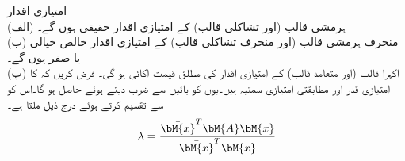 \quad امتیازی اقدار\\
(الف) ہرمشی قالب (اور تشاکلی قالب) کے امتیازی اقدار حقیقی ہوں گے۔\\
(ب) منحرف ہرمشی قالب (اور منحرف تشاکلی قالب) کے امتیازی اقدار خالص خیالی یا صفر  ہوں گے۔\\
(پ) اکہرا قالب (اور متعامد قالب) کے امتیازی اقدار کی مطلق قیمت اکائی  ہو گی۔
فرض کریں کہ  کا امتیازی قدر   اور مطابقتی امتیازی سمتیہ   ہیں۔یوں  کو بائیں   سے ضرب دیتے ہوئے  حاصل ہو گا۔اس کو   سے تقسیم کرتے ہوئے درج ذیل ملتا ہے۔
\begin{align}\label{مساوات_امتیازی_مسئلہ_اقدار_الف}
\lambda=\frac{\bar{\bM{x}}^T\bM{A}\bM{x}}{\bar{\bM{x}}^T\bM{x}}
\end{align}


